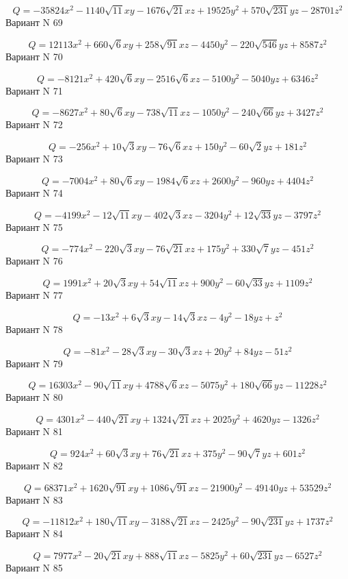 \documentclass[11pt]{report}
\begin{document}
$$Q = - 35824 x^{2} - 1140 \sqrt{11} x y - 1676 \sqrt{21} x z + 19525 y^{2} + 570 \sqrt{231} y z - 28701 z^{2}$$Вариант N 69

$$Q = 12113 x^{2} + 660 \sqrt{6} x y + 258 \sqrt{91} x z - 4450 y^{2} - 220 \sqrt{546} y z + 8587 z^{2}$$Вариант N 70

$$Q = - 8121 x^{2} + 420 \sqrt{6} x y - 2516 \sqrt{6} x z - 5100 y^{2} - 5040 y z + 6346 z^{2}$$Вариант N 71

$$Q = - 8627 x^{2} + 80 \sqrt{6} x y - 738 \sqrt{11} x z - 1050 y^{2} - 240 \sqrt{66} y z + 3427 z^{2}$$Вариант N 72

$$Q = - 256 x^{2} + 10 \sqrt{3} x y - 76 \sqrt{6} x z + 150 y^{2} - 60 \sqrt{2} y z + 181 z^{2}$$Вариант N 73

$$Q = - 7004 x^{2} + 80 \sqrt{6} x y - 1984 \sqrt{6} x z + 2600 y^{2} - 960 y z + 4404 z^{2}$$Вариант N 74

$$Q = - 4199 x^{2} - 12 \sqrt{11} x y - 402 \sqrt{3} x z - 3204 y^{2} + 12 \sqrt{33} y z - 3797 z^{2}$$Вариант N 75

$$Q = - 774 x^{2} - 220 \sqrt{3} x y - 76 \sqrt{21} x z + 175 y^{2} + 330 \sqrt{7} y z - 451 z^{2}$$Вариант N 76

$$Q = 1991 x^{2} + 20 \sqrt{3} x y + 54 \sqrt{11} x z + 900 y^{2} - 60 \sqrt{33} y z + 1109 z^{2}$$Вариант N 77

$$Q = - 13 x^{2} + 6 \sqrt{3} x y - 14 \sqrt{3} x z - 4 y^{2} - 18 y z + z^{2}$$Вариант N 78

$$Q = - 81 x^{2} - 28 \sqrt{3} x y - 30 \sqrt{3} x z + 20 y^{2} + 84 y z - 51 z^{2}$$Вариант N 79

$$Q = 16303 x^{2} - 90 \sqrt{11} x y + 4788 \sqrt{6} x z - 5075 y^{2} + 180 \sqrt{66} y z - 11228 z^{2}$$Вариант N 80

$$Q = 4301 x^{2} - 440 \sqrt{21} x y + 1324 \sqrt{21} x z + 2025 y^{2} + 4620 y z - 1326 z^{2}$$Вариант N 81

$$Q = 924 x^{2} + 60 \sqrt{3} x y + 76 \sqrt{21} x z + 375 y^{2} - 90 \sqrt{7} y z + 601 z^{2}$$Вариант N 82

$$Q = 68371 x^{2} + 1620 \sqrt{91} x y + 1086 \sqrt{91} x z - 21900 y^{2} - 49140 y z + 53529 z^{2}$$Вариант N 83

$$Q = - 11812 x^{2} + 180 \sqrt{11} x y - 3188 \sqrt{21} x z - 2425 y^{2} - 90 \sqrt{231} y z + 1737 z^{2}$$Вариант N 84

$$Q = 7977 x^{2} - 20 \sqrt{21} x y + 888 \sqrt{11} x z - 5825 y^{2} + 60 \sqrt{231} y z - 6527 z^{2}$$Вариант N 85
\end{document}
